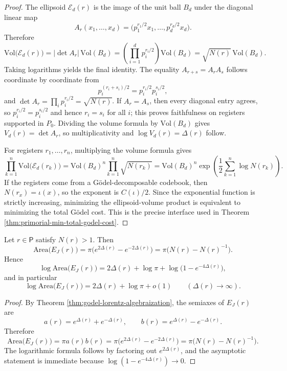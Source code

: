 \begin{proof}
The ellipsoid \(\mathcal E_d(r)\) is the image of the unit ball \(B_d\) under the diagonal linear map
\[
A_r(x_1,\dots,x_d)=\bigl(p_1^{r_1/2}x_1,\dots,p_d^{r_d/2}x_d\bigr).
\]
Therefore
\[
\mathrm{Vol}\bigl(\mathcal E_d(r)\bigr)=|\det A_r|\,\mathrm{Vol}(B_d)
=\left(\prod_{i=1}^{d}p_i^{r_i/2}\right)\mathrm{Vol}(B_d)
=\sqrt{N(r)}\,\mathrm{Vol}(B_d).
\]
Taking logarithms yields the final identity.
The equality \(A_{r+s}=A_rA_s\) follows coordinate by coordinate from
\[
p_i^{(r_i+s_i)/2}=p_i^{r_i/2}p_i^{s_i/2},
\]
and \(\det A_r=\prod_i p_i^{r_i/2}=\sqrt{N(r)}\). If \(A_r=A_s\), then every diagonal entry agrees, so \(p_i^{r_i/2}=p_i^{s_i/2}\) and hence \(r_i=s_i\) for all \(i\); this proves faithfulness on registers supported in \(P_0\). Dividing the volume formula by \(\mathrm{Vol}(B_d)\) gives \(V_d(r)=\det A_r\), so multiplicativity and \(\log V_d(r)=\Delta(r)\) follow.

For registers \(r_1,\dots,r_n\), multiplying the volume formula gives
\[
\prod_{k=1}^{n}\mathrm{Vol}\bigl(\mathcal E_d(r_k)\bigr)
=\mathrm{Vol}(B_d)^n\prod_{k=1}^{n}\sqrt{N(r_k)}
=\mathrm{Vol}(B_d)^n\exp\!\left(\frac12\sum_{k=1}^{n}\log N(r_k)\right).
\]
If the registers come from a G\"odel-decomposable codebook, then \(N(r_x)=\iota(x)\), so the exponent is \(C(\iota)/2\). Since the exponential function is strictly increasing, minimizing the ellipsoid-volume product is equivalent to minimizing the total G\"odel cost. This is the precise interface used in Theorem \ref{thm:primorial-min-total-godel-cost}.
\end{proof}

\begin{corollary}\label{cor:ellipse-area-ellipsoid-gap}
Let \(r\in\mathsf P\) satisfy \(N(r)>1\). Then
\[
\mathrm{Area}\bigl(E_J(r)\bigr)
=\pi\bigl(e^{2\Delta(r)}-e^{-2\Delta(r)}\bigr)
=\pi\bigl(N(r)-N(r)^{-1}\bigr).
\]
Hence
\[
\log\mathrm{Area}\bigl(E_J(r)\bigr)
=2\Delta(r)+\log\pi+\log\bigl(1-e^{-4\Delta(r)}\bigr),
\]
and in particular
\[
\log\mathrm{Area}\bigl(E_J(r)\bigr)=2\Delta(r)+\log\pi+o(1)
\qquad (\Delta(r)\to\infty).
\]
\end{corollary}

\begin{proof}
By Theorem \ref{thm:godel-lorentz-algebraization}, the semiaxes of \(E_J(r)\) are
\[
a(r)=e^{\Delta(r)}+e^{-\Delta(r)},
\qquad
b(r)=e^{\Delta(r)}-e^{-\Delta(r)}.
\]
Therefore
\[
\mathrm{Area}\bigl(E_J(r)\bigr)
=\pi a(r)b(r)
=\pi\bigl(e^{2\Delta(r)}-e^{-2\Delta(r)}\bigr)
=\pi\bigl(N(r)-N(r)^{-1}\bigr).
\]
The logarithmic formula follows by factoring out \(e^{2\Delta(r)}\), and the asymptotic statement is immediate because \(\log(1-e^{-4\Delta(r)})\to 0\).
\end{proof}


